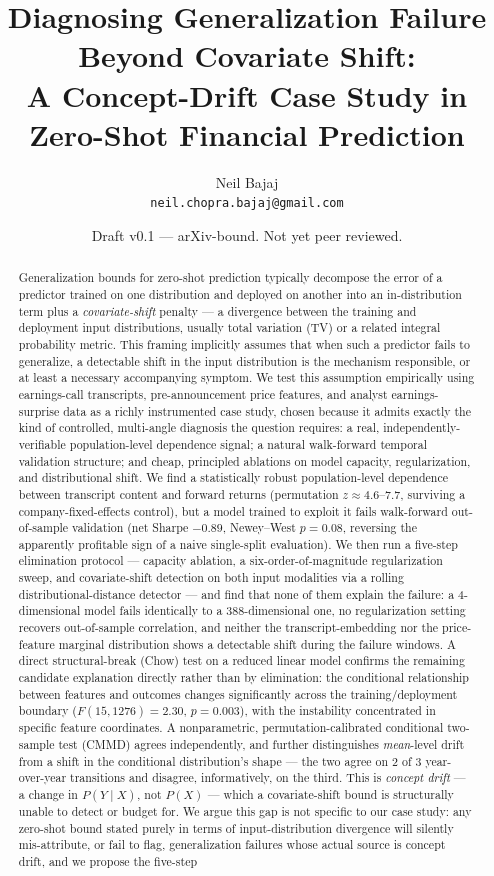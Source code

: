 \documentclass[11pt]{article}
\title{Diagnosing Generalization Failure Beyond Covariate Shift:\\
A Concept-Drift Case Study in Zero-Shot Financial Prediction}
\author{Neil Bajaj\\ \texttt{neil.chopra.bajaj@gmail.com}}
\date{Draft v0.1 --- arXiv-bound. Not yet peer reviewed.}
\begin{document}
\maketitle

\begin{abstract}
Generalization bounds for zero-shot prediction typically decompose the error of a predictor trained on one distribution and deployed on another into an in-distribution term plus a \emph{covariate-shift} penalty --- a divergence between the training and deployment input distributions, usually total variation (TV) or a related integral probability metric. This framing implicitly assumes that when such a predictor fails to generalize, a detectable shift in the input distribution is the mechanism responsible, or at least a necessary accompanying symptom. We test this assumption empirically using earnings-call transcripts, pre-announcement price features, and analyst earnings-surprise data as a richly instrumented case study, chosen because it admits exactly the kind of controlled, multi-angle diagnosis the question requires: a real, independently-verifiable population-level dependence signal; a natural walk-forward temporal validation structure; and cheap, principled ablations on model capacity, regularization, and distributional shift. We find a statistically robust population-level dependence between transcript content and forward returns (permutation $z\approx4.6$--$7.7$, surviving a company-fixed-effects control), but a model trained to exploit it fails walk-forward out-of-sample validation (net Sharpe $-0.89$, Newey--West $p=0.08$, reversing the apparently profitable sign of a naive single-split evaluation). We then run a five-step elimination protocol --- capacity ablation, a six-order-of-magnitude regularization sweep, and covariate-shift detection on both input modalities via a rolling distributional-distance detector --- and find that none of them explain the failure: a 4-dimensional model fails identically to a 388-dimensional one, no regularization setting recovers out-of-sample correlation, and neither the transcript-embedding nor the price-feature marginal distribution shows a detectable shift during the failure windows. A direct structural-break (Chow) test on a reduced linear model confirms the remaining candidate explanation directly rather than by elimination: the conditional relationship between features and outcomes changes significantly across the training/deployment boundary ($F(15,1276)=2.30$, $p=0.003$), with the instability concentrated in specific feature coordinates. A nonparametric, permutation-calibrated conditional two-sample test (CMMD) agrees independently, and further distinguishes \emph{mean}-level drift from a shift in the conditional distribution's shape --- the two agree on 2 of 3 year-over-year transitions and disagree, informatively, on the third. This is \emph{concept drift} --- a change in $P(Y\mid X)$, not $P(X)$ --- which a covariate-shift bound is structurally unable to detect or budget for. We argue this gap is not specific to our case study: any zero-shot bound stated purely in terms of input-distribution divergence will silently mis-attribute, or fail to flag, generalization failures whose actual source is concept drift, and we propose the five-step 
\end{abstract}
\end{document}
